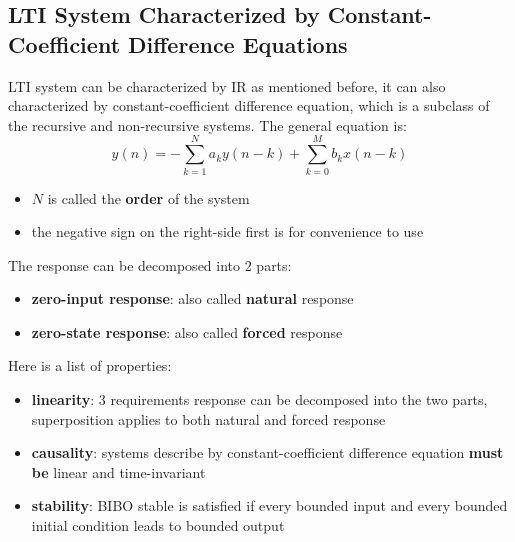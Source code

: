 \documentclass[10pt,a4paper,oneside]{article}
\begin{document}
\subsection{LTI System Characterized by Constant-Coefficient Difference Equations}
LTI system can be characterized by IR as mentioned before, it can also characterized by constant-coefficient difference equation, which is a subclass of the recursive and non-recursive systems. The general equation is:
\[
y(n) = - \sum_{k=1}^{N}a_k y(n-k) + \sum_{k=0}^{M}b_k x(n-k)
\] 
\begin{itemize}
	\item $N$ is called the \textbf{order} of the system
	\item the negative sign on the right-side first is for convenience to use
\end{itemize}
The response can be decomposed into $2$ parts:
\begin{itemize}
	\item \textbf{zero-input response}: also called \textbf{natural} response
	\item \textbf{zero-state response}: also called \textbf{forced} response
\end{itemize}
Here is a list of properties:
\begin{itemize}
	\item \textbf{linearity}: $3$ requirements response can be decomposed into the two parts, superposition applies to both natural and forced response
	\item \textbf{causality}: systems describe by constant-coefficient difference equation \textbf{must be} linear and time-invariant
	\item \textbf{stability}: BIBO stable is satisfied if every bounded input and every bounded initial condition leads to bounded output
\end{itemize}
\end{document}
